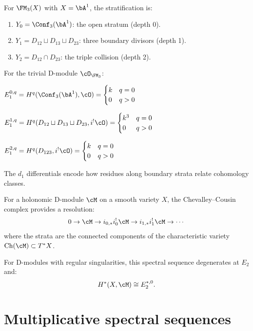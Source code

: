 \begin{computation}
\label{comp:cc-fm3}
For $\FM_3(X)$ with $X = \bA^1$, the stratification is:
\begin{enumerate}[label=(\roman*)]
\item $Y_0 = \Conf_3(\bA^1)$: the open stratum (depth 0).
\item $Y_1 = D_{12} \sqcup D_{13} \sqcup D_{23}$: three boundary divisors (depth 1).
\item $Y_2 = D_{12} \cap D_{23}$: the triple collision (depth 2).
\end{enumerate}

For the trivial D-module $\cO_{\FM_3}$:

$E_1^{0,q} = H^q(\Conf_3(\bA^1), \cO) = \begin{cases} k & q = 0 \\ 0 & q > 0 \end{cases}$

$E_1^{1,q} = H^q(D_{12} \sqcup D_{13} \sqcup D_{23}, i^! \cO) = \begin{cases} k^3 & q = 0 \\ 0 & q > 0 \end{cases}$

$E_1^{2,q} = H^q(D_{123}, i^! \cO) = \begin{cases} k & q = 0 \\ 0 & q > 0 \end{cases}$

The $d_1$ differentials encode how residues along boundary strata relate cohomology 
classes.
\end{computation}

\begin{theorem}
\label{thm:cousin-resolution}
For a holonomic D-module $\cM$ on a smooth variety $X$, the Chevalley--Cousin 
complex provides a resolution:
\[
0 \to \cM \to i_{0,*} i_0^! \cM \to i_{1,*} i_1^! \cM \to \cdots
\]
where the strata are the connected components of the characteristic variety 
$\mathrm{Ch}(\cM) \subset T^*X$.

For D-modules with regular singularities, this spectral sequence degenerates 
at $E_2$ and:
\[
H^*(X, \cM) \cong E_2^{*,0}.
\]
\end{theorem}


\section{Multiplicative spectral sequences}
\label{sec:mult-ss}


